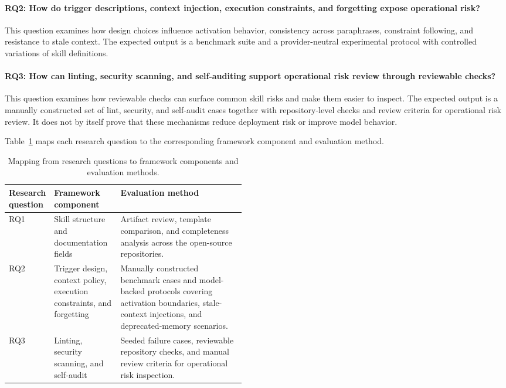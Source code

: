 \documentclass[11pt]{article}
\begin{document}
\paragraph{RQ2: How do trigger descriptions, context injection, execution
constraints, and forgetting expose operational risk?}

This question examines how design choices influence activation behavior,
consistency across paraphrases, constraint following, and resistance to stale
context. The expected output is a benchmark suite and a provider-neutral
experimental protocol with controlled variations of skill definitions.

\paragraph{RQ3: How can linting, security scanning, and self-auditing support
operational risk review through reviewable checks?}

This question examines how reviewable checks can surface common skill risks and
make them easier to inspect. The expected output is a manually constructed set
of lint, security, and self-audit cases together with repository-level checks
and review criteria for operational risk review. It does not by itself prove
that these mechanisms reduce deployment risk or improve model behavior.

Table~\ref{tab:rq-mapping} maps each research question to the corresponding
framework component and evaluation method.

\begin{table}[t]
\centering
\footnotesize
\begin{tabularx}{\linewidth}{
    >{\raggedright\arraybackslash}p{0.18\linewidth}
    >{\raggedright\arraybackslash}p{0.29\linewidth}
    >{\raggedright\arraybackslash}X
}
\toprule
\textbf{Research question} & \textbf{Framework component} &
\textbf{Evaluation method} \\
\midrule
RQ1 & Skill structure and documentation fields & Artifact review, template
comparison, and completeness analysis across the open-source repositories. \\
RQ2 & Trigger design, context policy, execution constraints, and forgetting &
Manually constructed benchmark cases and model-backed protocols covering
activation boundaries, stale-context injections, and deprecated-memory
scenarios. \\
RQ3 & Linting, security scanning, and self-audit & Seeded failure cases,
reviewable repository checks, and manual review criteria for operational risk
inspection. \\
\bottomrule
\end{tabularx}
\caption{Mapping from research questions to framework components and evaluation
methods.}
\label{tab:rq-mapping}
\end{table}
\end{document}
